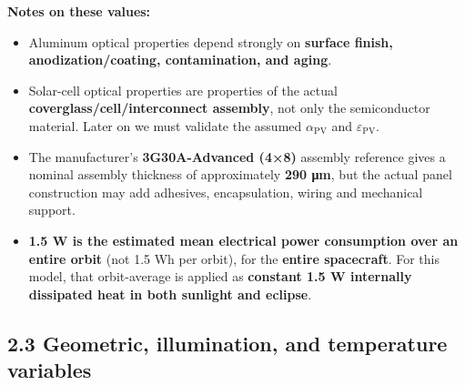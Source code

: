 \documentclass[
]{book}
\providecommand{\tightlist}{%
  \setlength{\itemsep}{0pt}\setlength{\parskip}{0pt}}
\begin{document}
\textbf{Notes on these values:}

\begin{itemize}
\tightlist
\item
  Aluminum optical properties depend strongly on \textbf{surface finish, anodization/coating, contamination, and aging}.
\item
  Solar-cell optical properties are properties of the actual \textbf{coverglass/cell/interconnect assembly}, not only the semiconductor material. Later on we must validate the assumed \(\alpha_{\mathrm{PV}}\) and \(\varepsilon_{\mathrm{PV}}\).
\item
  The manufacturer's \textbf{3G30A-Advanced (4×8)} assembly reference gives a nominal assembly thickness of approximately \textbf{290 μm}, but the actual panel construction may add adhesives, encapsulation, wiring and mechanical support.
\item
  \textbf{1.5 W is the estimated mean electrical power consumption over an entire orbit} (not 1.5 Wh per orbit), for the \textbf{entire spacecraft}. For this model, that orbit-average is applied as \textbf{constant 1.5 W internally dissipated heat in both sunlight and eclipse}.
\end{itemize}

\subsection{2.3 Geometric, illumination, and temperature variables}\label{geometric-illumination-and-temperature-variables}
\end{document}
